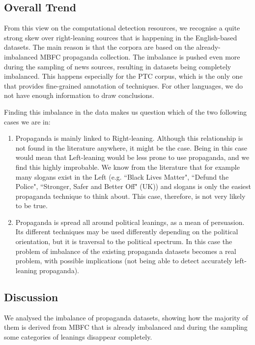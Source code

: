 \subsection{Overall Trend}
From this view on the computational detection resources, we recognise a quite strong skew over right-leaning sources that is happening in the English-based datasets.
The main reason is that the corpora are based on the already-imbalanced MBFC propaganda collection. The imbalance is pushed even more during the sampling of news sources, resulting in datasets being completely imbalanced.
This happens especially for the PTC corpus, which is the only one that provides fine-grained annotation of techniques.
For other languages, we do not have enough information to draw conclusions.

Finding this imbalance in the data makes us question which of the two following cases we are in:

\begin{enumerate}
    \item Propaganda is mainly linked to Right-leaning. Although this relationship is not found in the literature anywhere, it might be the case. Being in this case would mean that Left-leaning would be less prone to use propaganda, and we find this highly improbable. We know from the literature that for example many slogans exist in the Left (e.g. ``Black Lives Matter", ``Defund the Police", ``Stronger, Safer and Better Off" (UK)) and slogans is only the easiest propaganda technique to think about. This case, therefore, is not very likely to be true.
    \item Propaganda is spread all around political leanings, as a mean of persuasion. Its different techniques may be used differently depending on the political orientation, but it is traversal to the political spectrum. In this case
          the problem of imbalance of the existing propaganda datasets becomes a real problem, with possible implications (not being able to detect accurately left-leaning propaganda).
\end{enumerate}

\subsection{Discussion}
We analysed the imbalance of propaganda datasets, showing how the majority of them is derived from MBFC that is already imbalanced and during the sampling some categories of leanings disappear completely.

